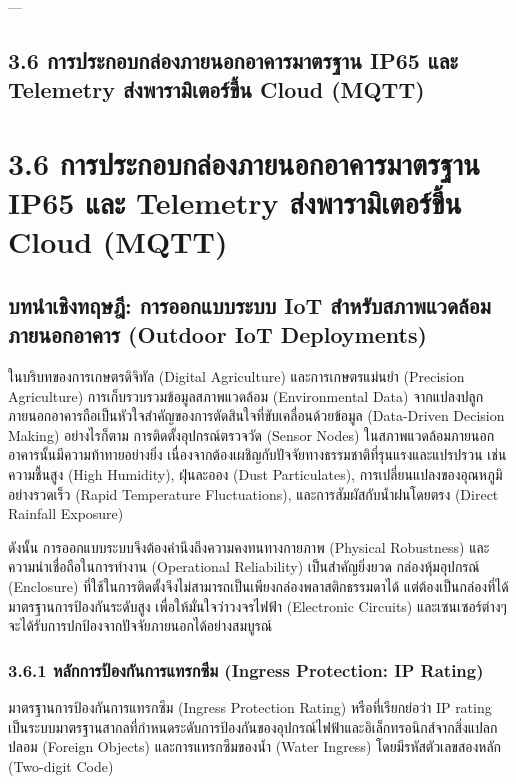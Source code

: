 \documentclass[11pt,a4paper,openany]{report}
\begin{document}
---

\section{3.6 การประกอบกล่องภายนอกอาคารมาตรฐาน IP65 และ Telemetry ส่งพารามิเตอร์ขึ้น Cloud (MQTT)}


\chapter{3.6 การประกอบกล่องภายนอกอาคารมาตรฐาน IP65 และ Telemetry ส่งพารามิเตอร์ขึ้น Cloud (MQTT)}


\section{บทนำเชิงทฤษฎี: การออกแบบระบบ IoT สำหรับสภาพแวดล้อมภายนอกอาคาร (Outdoor IoT Deployments)}


ในบริบทของการเกษตรดิจิทัล (Digital Agriculture) และการเกษตรแม่นยำ (Precision Agriculture) การเก็บรวบรวมข้อมูลสภาพแวดล้อม (Environmental Data) จากแปลงปลูกภายนอกอาคารถือเป็นหัวใจสำคัญของการตัดสินใจที่ขับเคลื่อนด้วยข้อมูล (Data-Driven Decision Making) อย่างไรก็ตาม การติดตั้งอุปกรณ์ตรวจวัด (Sensor Nodes) ในสภาพแวดล้อมภายนอกอาคารนั้นมีความท้าทายอย่างยิ่ง เนื่องจากต้องเผชิญกับปัจจัยทางธรรมชาติที่รุนแรงและแปรปรวน เช่น ความชื้นสูง (High Humidity), ฝุ่นละออง (Dust Particulates), การเปลี่ยนแปลงของอุณหภูมิอย่างรวดเร็ว (Rapid Temperature Fluctuations), และการสัมผัสกับน้ำฝนโดยตรง (Direct Rainfall Exposure)

ดังนั้น การออกแบบระบบจึงต้องคำนึงถึงความคงทนทางกายภาพ (Physical Robustness) และความน่าเชื่อถือในการทำงาน (Operational Reliability) เป็นสำคัญยิ่งยวด กล่องหุ้มอุปกรณ์ (Enclosure) ที่ใช้ในการติดตั้งจึงไม่สามารถเป็นเพียงกล่องพลาสติกธรรมดาได้ แต่ต้องเป็นกล่องที่ได้มาตรฐานการป้องกันระดับสูง เพื่อให้มั่นใจว่าวงจรไฟฟ้า (Electronic Circuits) และเซนเซอร์ต่างๆ จะได้รับการปกป้องจากปัจจัยภายนอกได้อย่างสมบูรณ์

\subsection{3.6.1 หลักการป้องกันการแทรกซึม (Ingress Protection: IP Rating)}


มาตรฐานการป้องกันการแทรกซึม (Ingress Protection Rating) หรือที่เรียกย่อว่า IP rating เป็นระบบมาตรฐานสากลที่กำหนดระดับการป้องกันของอุปกรณ์ไฟฟ้าและอิเล็กทรอนิกส์จากสิ่งแปลกปลอม (Foreign Objects) และการแทรกซึมของน้ำ (Water Ingress) โดยมีรหัสตัวเลขสองหลัก (Two-digit Code)
\end{document}
